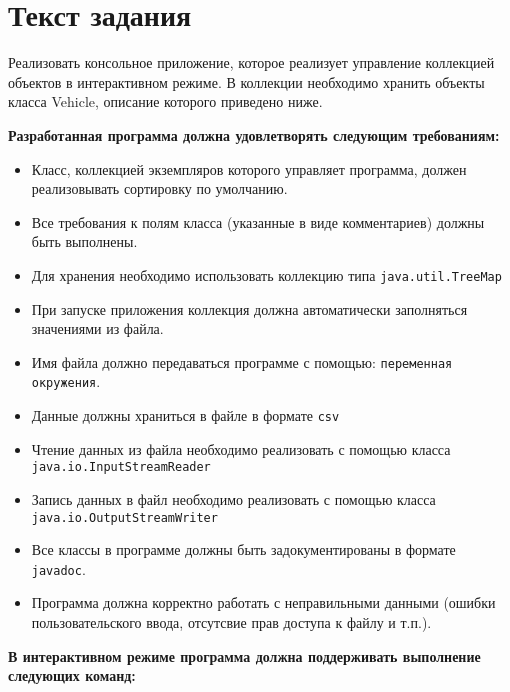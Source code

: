 \section{Текст задания}

Реализовать консольное приложение, которое реализует управление коллекцией объектов в интерактивном режиме.
В коллекции необходимо хранить объекты класса Vehicle, описание которого приведено ниже.

\textbf{Разработанная программа должна удовлетворять следующим требованиям:}

\begin{itemize}
\item Класс, коллекцией экземпляров которого управляет программа, должен реализовывать сортировку по умолчанию.
\item Все требования к полям класса (указанные в виде комментариев) должны быть выполнены.
\item Для хранения необходимо использовать коллекцию типа \texttt{java.util.TreeMap}
\item При запуске приложения коллекция должна автоматически заполняться значениями из файла.
\item Имя файла должно передаваться программе с помощью: \texttt{переменная окружения}.
\item Данные должны храниться в файле в формате \texttt{csv}
\item Чтение данных из файла необходимо реализовать с помощью класса \texttt{java.io.Input\-StreamReader}
\item Запись данных в файл необходимо реализовать с помощью класса \texttt{java.io.Output\-StreamWriter}
\item Все классы в программе должны быть задокументированы в формате \texttt{javadoc}.
\item Программа должна корректно работать с неправильными данными (ошибки пользовательского ввода, отсутсвие прав доступа к файлу и т.п.).
\end{itemize}

\textbf{В интерактивном режиме программа должна поддерживать выполнение следующих команд:}


